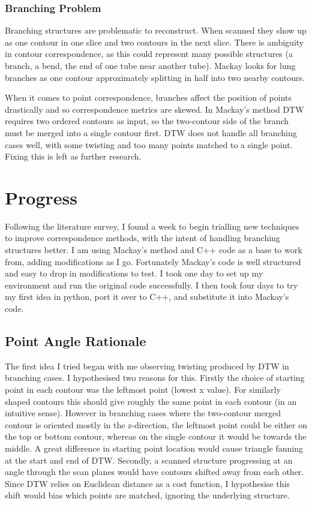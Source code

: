 \documentclass[11pt]{article}
\begin{document}
\subsubsection{Branching Problem}

Branching structures are problematic to reconstruct. When scanned they show up as one contour in one slice and two contours in the next slice. There is ambiguity in contour correspondence, as this could represent many possible structures (a branch, a bend, the end of one tube near another tube). Mackay \cite{robust2019construction} looks for lung branches as one contour approximately splitting in half into two nearby contours.

When it comes to point correspondence, branches affect the position of points drastically and so correspondence metrics are skewed. In Mackay's \cite{mackay2019robust} method DTW requires two ordered contours as input, so the two-contour side of the branch must be merged into a single contour first. DTW does not handle all branching cases well, with some twisting and too many points matched to a single point. Fixing this is left as further research.

\section{Progress}

Following the literature survey, I found a week to begin trialling new techniques to improve correspondence methods, with the intent of handling branching structures better. I am using Mackay's method and C++ code as a base to work from, adding modifications as I go. Fortunately Mackay's code is well structured and easy to drop in modifications to test. I took one day to set up my environment and run the original code successfully. I then took four days to try my first idea in python, port it over to C++, and substitute it into Mackay's code.

\subsection{Point Angle Rationale}

The first idea I tried began with me observing twisting produced by DTW in branching cases. I hypothesised two reasons for this. Firstly the choice of starting point in each contour was the leftmost point (lowest x value). For similarly shaped contours this should give roughly the same point in each contour (in an intuitive sense). However in branching cases where the two-contour merged contour is oriented mostly in the z-direction, the leftmost point could be either on the top or bottom contour, whereas on the single contour it would be towards the middle. A great difference in starting point location would cause triangle fanning at the start and end of DTW. Secondly, a scanned structure progressing at an angle through the scan planes would have contours shifted away from each other. Since DTW relies on Euclidean distance as a cost function, I hypothesise this shift would bias which points are matched, ignoring the underlying structure.
\end{document}
